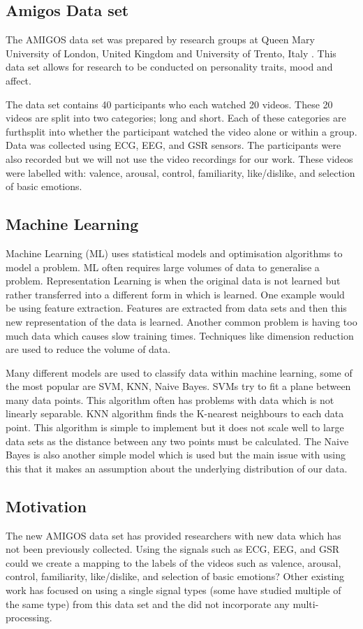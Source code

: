 \subsection{Amigos Data set}
The AMIGOS data set was prepared by research groups at
Queen Mary University of London, United Kingdom and
University of Trento, Italy \cite{AMIGOS:2018}.
This data set allows for research to be conducted on
personality traits, mood and affect.

The data set contains 40 participants who each watched 20 videos.
These 20 videos are split into two categories; long and short.
Each of these categories are furthsplit into
whether the participant watched the video alone or within a group.
Data was collected using ECG, EEG, and GSR sensors.
The participants were also recorded but we will not use the video recordings
for our work.
These videos were labelled with:
valence, arousal, control, familiarity, like/dislike,
and selection of basic emotions.

\subsection{Machine Learning}
Machine Learning (ML) uses statistical models and
optimisation algorithms to model a problem.
ML often requires large volumes of data to generalise a problem.
Representation Learning is when the original data is not learned
but rather transferred into a different form in which is learned.
One example would be using feature extraction.
Features are extracted from data sets and then this new representation of the data
is learned.
Another common problem is having too much data which causes slow training times.
Techniques like dimension reduction are used to reduce the volume of
data.

Many different models are used to classify data within machine learning,
some of the most popular are SVM, KNN, Naive Bayes.
SVMs try to fit a plane between many data points.
This algorithm often has problems with data which is not
linearly separable.
KNN algorithm finds the K-nearest neighbours to each data point.
This algorithm is simple to implement but it does not scale well
to large data sets as the distance between any two points must be calculated.
The Naive Bayes is also another simple model which is used but the main issue
with using this that it makes an assumption about the underlying distribution of
our data.

\subsection{Motivation}
The new AMIGOS data set has provided researchers with new
data which has not been previously collected.
Using the signals such as ECG, EEG, and GSR
could we create a mapping to the
labels of the videos such as
valence, arousal, control, familiarity, like/dislike,
and selection of basic emotions?
Other existing work has focused on using a single signal types
(some have studied multiple of the same type) from this data set
and the did not incorporate any multi-processing.
